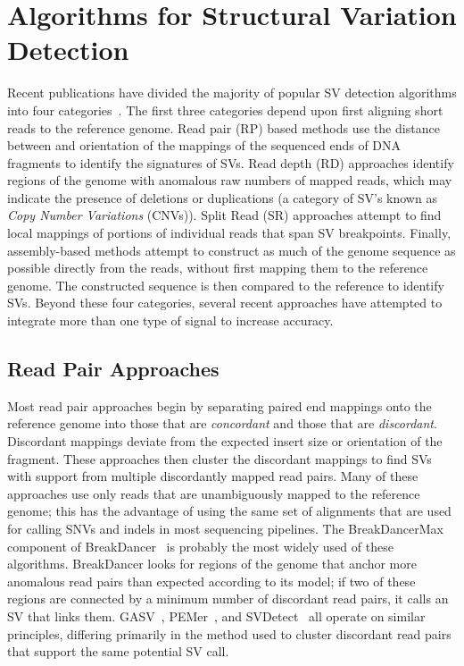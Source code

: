 \chapter{Algorithms for Structural Variation Detection}\label{chap_related_work}

Recent publications have divided the majority of popular SV detection algorithms into four categories~\cite{Alkan:2011p547}. The first three categories depend upon first aligning short reads to the reference genome. Read pair (RP) based methods use the distance between and orientation of the mappings of the sequenced ends of DNA fragments to identify the signatures of SVs. Read depth (RD) approaches identify regions of the genome with anomalous raw numbers of mapped reads, which may indicate the presence of deletions or duplications (a category of SV's known as \emph{Copy Number Variations} (CNVs)). Split Read (SR) approaches attempt to find local mappings of portions of individual reads that span SV breakpoints. Finally, assembly-based methods attempt to construct as much of the genome sequence as possible directly from the reads, without first mapping them to the reference genome. The constructed sequence is then compared to the reference to identify SVs. Beyond these four categories, several recent approaches have attempted to integrate more than one type of signal to increase accuracy.

\section{Read Pair Approaches}\label{section_read_pair}

Most read pair approaches begin by separating paired end mappings onto the reference genome into those that are \emph{concordant} and those that are \emph{discordant}. Discordant mappings deviate from the expected insert size or orientation of the fragment. These approaches then cluster the discordant mappings to find SVs with support from multiple discordantly mapped read pairs. Many of these approaches use only reads that are unambiguously mapped to the reference genome; this has the advantage of using the same set of alignments that are used for calling SNVs and indels in most sequencing pipelines. The BreakDancerMax component of BreakDancer~\cite{Chen:2009p3} is probably the most widely used of these algorithms. BreakDancer looks for regions of the genome that anchor more anomalous read pairs than expected according to its model; if two of these regions are connected by a minimum number of discordant read pairs, it calls an SV that links them. GASV~\cite{Sindi:2009gu}, PEMer~\cite{Korbel:2009dy}, and SVDetect~\cite{Zeitouni:2010p8} all operate on similar principles, differing primarily in the method used to cluster discordant read pairs that support the same potential SV call.

